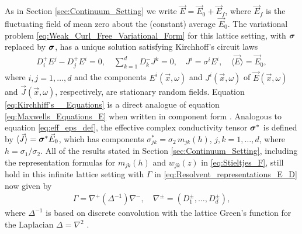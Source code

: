 \documentclass{cmslatex}
\newcommand\bsig{\mbox{\boldmath${\sigma}$}}
\begin{document}
As in Section \ref{sec:Continuum_Setting} we write
$\vec{E}=\vec{E}_0+\vec{E}_f$, where $\vec{E}_f$ is the fluctuating
field of mean zero about the (constant) average $\vec{E}_0$. 
The variational problem \eqref{eq:Weak_Curl_Free_Variational_Form} for
this lattice setting, with $\bsig$ replaced by $\bsig$, has a unique
solution satisfying Kirchhoff's circuit laws
\cite{Golden:CMP-473,Bruno:JSP-365}      
%
\begin{align}\label{eq:Kirchhiff's__Equations}
  D_i^+E^j-D_j^+E^i=0, \quad
  \sum_{k=1}^dD_k^-J^k=0, \quad
  J^i=\sigma^iE^i, \quad
  \langle\vec{E}\rangle=\vec{E}_0,
\end{align}
%
where $i,j=1,\ldots,d$ and the components $E^i(\vec{x},\omega)$ and
$J^i(\vec{x},\omega)$ of $\vec{E}(\vec{x},\omega)$ and $\vec{J}(\vec{x},\omega)$,
respectively, are stationary random fields. 
Equation \eqref{eq:Kirchhiff's__Equations} is a direct analogue of
equation \eqref{eq:Maxwells_Equations_E} when written in component
form \cite{Golden:CMP-473}. Analogous to equation
\eqref{eq:eff_eps_def}, the effective complex 
conductivity tensor $\bsig^*$ is defined by
$\langle\vec{J}\rangle=\bsig^*\vec{E}_0$, which has components
$\sigma^*_{jk}=\sigma_2\,m_{jk}(h)$, $j,k=1,\ldots,d$, where $h=\sigma_1/\sigma_2$. All of the
results stated in Section \ref{sec:Continuum_Setting}, including the
representation formulas for $m_{jk}(h)$ and $w_{jk}(z)$ in
\eqref{eq:Stieltjes_F}, still hold in this infinite lattice setting 
with $\Gamma$ in \eqref{eq:Resolvent_representations_E_D} now given by 
%
\begin{align}\label{eq:Discrete_Gamma}
  \Gamma=\nabla^+(\Delta^{-1})\nabla^-, \quad \nabla^\pm = (D_1^\pm,\ldots,D_d^\pm),
\end{align}
%
where $\Delta^{-1}$ is based on discrete convolution with the lattice
Green's function for the Laplacian $\Delta=\nabla^2$ \cite{Bruno:JSP-365}.
\end{document}

